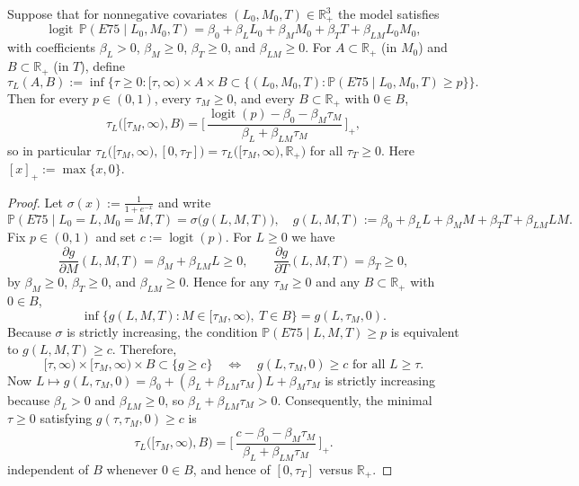 ﻿\begin{proposition}\label{prop:logit-threshold}
Suppose that for nonnegative covariates $(L_0,M_0,T)\in\mathbb R_+^3$ the model satisfies
\[
\operatorname{logit}\,\mathbb P(E75\mid L_0,M_0,T)=\beta_0+\beta_L L_0+\beta_M M_0+\beta_T T+\beta_{LM}L_0M_0,
\]
with coefficients $\beta_L>0$, $\beta_M\ge 0$, $\beta_T\ge 0$, and $\beta_{LM}\ge 0$. For $A\subset\mathbb R_+$ (in $M_0$) and $B\subset\mathbb R_+$ (in $T$), define
\[
\tau_L(A,B):=\inf\big\{\tau\ge 0:[\tau,\infty)\times A\times B\subset\{(L_0,M_0,T):\mathbb P(E75\mid L_0,M_0,T)\ge p\}\big\}.
\]
Then for every $p\in(0,1)$, every $\tau_M\ge 0$, and every $B\subset\mathbb R_+$ with $0\in B$,
\[
\tau_L\big([\tau_M,\infty),B\big)=\Bigg[\,\frac{\operatorname{logit}(p)-\beta_0-\beta_M\tau_M}{\beta_L+\beta_{LM}\tau_M}\,\Bigg]_+,
\]
so in particular $\tau_L\big([\tau_M,\infty),[0,\tau_T]\big)=\tau_L\big([\tau_M,\infty),\mathbb R_+\big)$ for all $\tau_T\ge 0$. Here $[x]_+:=\max\{x,0\}$.
\end{proposition}

\begin{proof}
Let $\sigma(x):=\tfrac{1}{1+e^{-x}}$ and write
\[
\mathbb P(E75\mid L_0{=}L,M_0{=}M,T)=\sigma\big(g(L,M,T)\big),\quad g(L,M,T):=\beta_0+\beta_L L+\beta_M M+\beta_T T+\beta_{LM}LM.
\]
Fix $p\in(0,1)$ and set $c:=\operatorname{logit}(p)$. For $L\ge 0$ we have
\[
\frac{\partial g}{\partial M}(L,M,T)=\beta_M+\beta_{LM}L\ge 0,\qquad \frac{\partial g}{\partial T}(L,M,T)=\beta_T\ge 0,
\]
by $\beta_M\ge 0$, $\beta_T\ge 0$, and $\beta_{LM}\ge 0$. Hence for any $\tau_M\ge 0$ and any $B\subset\mathbb R_+$ with $0\in B$,
\[
\inf\{g(L,M,T):M\in[\tau_M,\infty),\ T\in B\}=g(L,\tau_M,0).
\]
Because $\sigma$ is strictly increasing, the condition $\mathbb P(E75\mid L,M,T)\ge p$ is equivalent to $g(L,M,T)\ge c$. Therefore,
\[
[\tau,\infty)\times[\tau_M,\infty)\times B\subset\{g\ge c\}\quad\Longleftrightarrow\quad g(L,\tau_M,0)\ge c\text{ for all }L\ge\tau.
\]
Now $L\mapsto g(L,\tau_M,0)=\beta_0+(\beta_L+\beta_{LM}\tau_M)L+\beta_M\tau_M$ is strictly increasing because $\beta_L>0$ and $\beta_{LM}\ge 0$, so $\beta_L+\beta_{LM}\tau_M>0$. Consequently, the minimal $\tau\ge 0$ satisfying $g(\tau,\tau_M,0)\ge c$ is
\begin{equation*}
\tau_L\big([\tau_M,\infty),B\big)=\Bigg[\,\frac{c-\beta_0-\beta_M\tau_M}{\beta_L+\beta_{LM}\tau_M}\,\Bigg]_+.
\end{equation*}
independent of $B$ whenever $0\in B$, and hence of $[0,\tau_T]$ versus $\mathbb R_+$.\qedhere
\end{proof}
